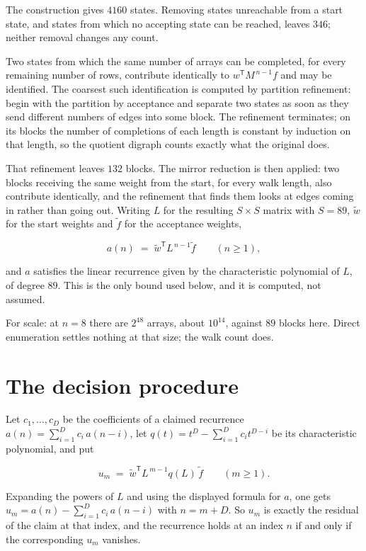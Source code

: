 \documentclass[11pt]{article}
\theoremstyle{definition}
\begin{document}
The construction gives $4160$ states. Removing states unreachable from a start state, and states from which no accepting state can be reached, leaves $346$; neither removal changes any count.

Two states from which the same number of arrays can be completed, for every remaining number of rows, contribute identically to $w^{\mathsf T}M^{\,n-1}f$ and may be identified. The coarsest such identification is computed by partition refinement: begin with the partition by acceptance and separate two states as soon as they send different numbers of edges into some block. The refinement terminates; on its blocks the number of completions of each length is constant by induction on that length, so the quotient digraph counts exactly what the original does.

That refinement leaves $132$ blocks. The mirror reduction is then applied: two blocks receiving the same weight from the start, for every walk length, also contribute identically, and the refinement that finds them looks at edges coming in rather than going out. Writing $L$ for the resulting $S \times S$ matrix with $S = 89$, $\tilde w$ for the start weights and $\tilde f$ for the acceptance weights,

\[a(n) \;=\; \tilde w^{\mathsf T} L^{\,n-1} \tilde f \qquad (n \ge 1),\]

and $a$ satisfies the linear recurrence given by the characteristic polynomial of $L$, of degree $89$. This is the only bound used below, and it is computed, not assumed.

For scale: at $n = 8$ there are $2^{48}$ arrays, about $10^{14}$, against $89$ blocks here. Direct enumeration settles nothing at that size; the walk count does.

\section{The decision procedure}

Let $c_1,\dots,c_D$ be the coefficients of a claimed recurrence $a(n) = \sum_{i=1}^{D} c_i\,a(n-i)$, let $q(t) = t^{D} - \sum_{i=1}^{D} c_i t^{D-i}$ be its characteristic polynomial, and put

\[u_m \;=\; \tilde w^{\mathsf T} L^{\,m-1} q(L)\,\tilde f \qquad (m \ge 1).\]

Expanding the powers of $L$ and using the displayed formula for $a$, one gets $u_m = a(n) - \sum_{i=1}^{D} c_i\,a(n-i)$ with $n = m + D$. So $u_m$ is exactly the residual of the claim at that index, and the recurrence holds at an index $n$ if and only if the corresponding $u_m$ vanishes.
\end{document}
